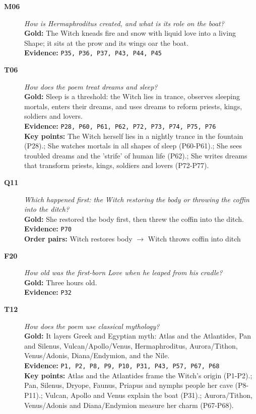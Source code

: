 \begin{description}
\item[\textbf{M06}] \emph{How is Hermaphroditus created, and what is its role on the boat?}
\\ \textbf{Gold:} The Witch kneads fire and snow with liquid love into a living Shape; it sits at the prow and its wings oar the boat.
\\ \textbf{Evidence:} \texttt{P35, P36, P37, P43, P44, P45}

\item[\textbf{T06}] \emph{How does the poem treat dreams and sleep?}
\\ \textbf{Gold:} Sleep is a threshold: the Witch lies in trance, observes sleeping mortals, enters their dreams, and uses dreams to reform priests, kings, soldiers and lovers.
\\ \textbf{Evidence:} \texttt{P28, P60, P61, P62, P72, P73, P74, P75, P76}
\\ \textbf{Key points:} The Witch herself lies in a nightly trance in the fountain (P28).; She watches mortals in all shapes of sleep (P60-P61).; She sees troubled dreams and the 'strife' of human life (P62).; She writes dreams that transform priests, kings, soldiers and lovers (P72-P77).

\item[\textbf{Q11}] \emph{Which happened first: the Witch restoring the body or throwing the coffin into the ditch?}
\\ \textbf{Gold:} She restored the body first, then threw the coffin into the ditch.
\\ \textbf{Evidence:} \texttt{P70}
\\ \textbf{Order pairs:} Witch restores body $\rightarrow$ Witch throws coffin into ditch

\item[\textbf{F20}] \emph{How old was the first-born Love when he leaped from his cradle?}
\\ \textbf{Gold:} Three hours old.
\\ \textbf{Evidence:} \texttt{P32}

\item[\textbf{T12}] \emph{How does the poem use classical mythology?}
\\ \textbf{Gold:} It layers Greek and Egyptian myth: Atlas and the Atlantides, Pan and Silenus, Vulcan/Apollo/Venus, Hermaphroditus, Aurora/Tithon, Venus/Adonis, Diana/Endymion, and the Nile.
\\ \textbf{Evidence:} \texttt{P1, P2, P8, P9, P10, P31, P43, P57, P67, P68}
\\ \textbf{Key points:} Atlas and the Atlantides frame the Witch's origin (P1-P2).; Pan, Silenus, Dryope, Faunus, Priapus and nymphs people her cave (P8-P11).; Vulcan, Apollo and Venus explain the boat (P31).; Aurora/Tithon, Venus/Adonis and Diana/Endymion measure her charm (P67-P68).

\end{description}